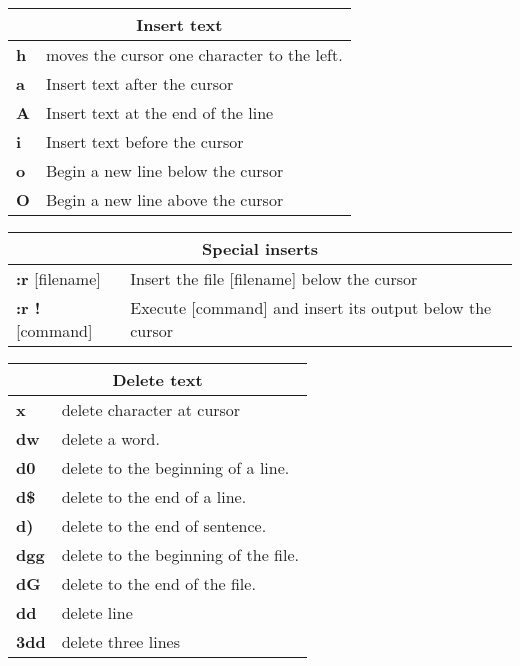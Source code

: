 \begin{table}[h]
\centering
\footnotesize
\begin{tabular}{|l|l|}
\multicolumn{2}{c}{\textbf{Insert text}}\\
\hline
\textbf{h}	& {moves the cursor one character to the left.}\\
\hline
\textbf{a}	& {Insert text after the cursor}\\
\hline
\textbf{A}	& {Insert text at the end of the line}\\
\hline
\textbf{i}	& {Insert text before the cursor}\\
\hline
\textbf{o}	& {Begin a new line below the cursor}\\
\hline
\textbf{O}	& {Begin a new line above the cursor}\\
\hline
\end{tabular}
\end{table}

\begin{table}[h]
\centering
\footnotesize
\begin{tabular}{|l|l|}
\multicolumn{2}{c}{\textbf{Special inserts}}\\
\hline
{\textbf{:r} [filename]} & {Insert the file [filename] below the cursor}\\
\hline
{\textbf{:r !}[command]} & {Execute [command] and insert its output below the cursor}\\
\hline
\end{tabular}
\end{table}

\begin{table}[h]
\centering
\footnotesize
\begin{tabular}{|l|l|}
\multicolumn{2}{c}{\textbf{Delete text}}\\
\hline
\textbf{x}	& {delete character at cursor}\\
\hline
\textbf{dw}	& {delete a word.}\\
\hline
\textbf{d0}	& {delete to the beginning of a line.}\\
\hline
\textbf{d\$} & {delete to the end of a line.}\\
\hline
\textbf{d)}	& {delete to the end of sentence.}\\
\hline
\textbf{dgg} & {delete to the beginning of the file.}\\
\hline
\textbf{dG}	& {delete to the end of the file.}\\
\hline
\textbf{dd}	& {delete line}\\
\hline
\textbf{3dd} & {delete three lines}\\
\hline
\end{tabular}
\end{table}

